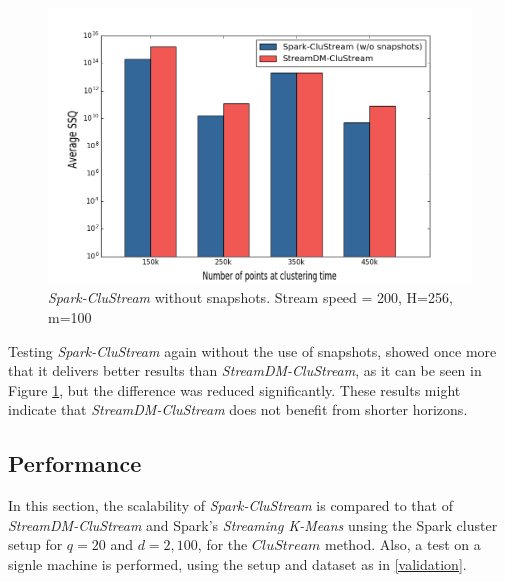 \documentclass{llncs}
\begin{document}
\begin{figure}[h]
 \centering
 \includegraphics[scale=0.4]{./styles/comparisonNoSnaps2.png}
 \caption{\textit{Spark-CluStream} without snapshots. Stream speed = 200, H=256, m=100}
 \label{fig:comparisonNoSnaps2}
\end{figure}

Testing \textit{Spark-CluStream} again without the use of snapshots, showed once more that it delivers better results than \textit{StreamDM-CluStream}, as it can be seen in Figure \ref{fig:comparisonNoSnaps2}, but the difference was reduced significantly. These results might indicate that \textit{StreamDM-CluStream} does not benefit from shorter horizons.

\subsection{Performance}

In this section, the scalability of \textit{Spark-CluStream} is compared to that of \textit{StreamDM-CluStream} and Spark's \textit{Streaming K-Means} unsing the Spark cluster setup for $q=20$ and $d=2,100$, for the $CluStream$ method. Also, a test on a signle machine is performed, using the setup and dataset as in \ref{validation}.
\end{document}
